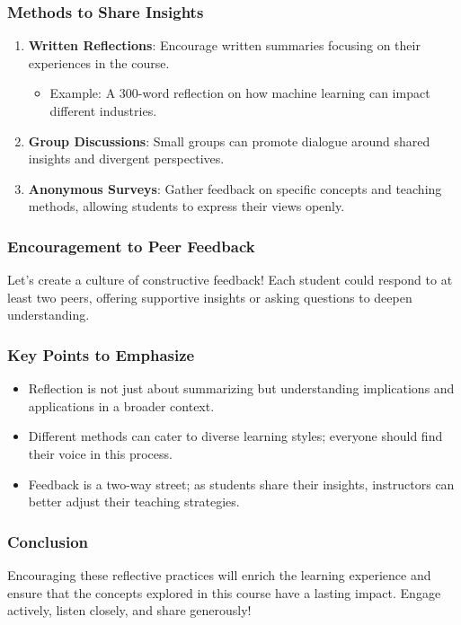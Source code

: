 \documentclass[aspectratio=169]{beamer}
\begin{document}
\begin{frame}[fragile]
    \frametitle{Methods to Share Insights}
    \begin{enumerate}
        \item \textbf{Written Reflections}: Encourage written summaries focusing on their experiences in the course. 
            \begin{itemize}
                \item Example: A 300-word reflection on how machine learning can impact different industries.
            \end{itemize}
        \item \textbf{Group Discussions}: Small groups can promote dialogue around shared insights and divergent perspectives.
        \item \textbf{Anonymous Surveys}: Gather feedback on specific concepts and teaching methods, allowing students to express their views openly.
    \end{enumerate}
\end{frame}

\begin{frame}[fragile]
    \frametitle{Encouragement to Peer Feedback}
    Let's create a culture of constructive feedback! Each student could respond to at least two peers, offering supportive insights or asking questions to deepen understanding.
\end{frame}

\begin{frame}[fragile]
    \frametitle{Key Points to Emphasize}
    \begin{itemize}
        \item Reflection is not just about summarizing but understanding implications and applications in a broader context.
        \item Different methods can cater to diverse learning styles; everyone should find their voice in this process.
        \item Feedback is a two-way street; as students share their insights, instructors can better adjust their teaching strategies.
    \end{itemize}
\end{frame}

\begin{frame}[fragile]
    \frametitle{Conclusion}
    Encouraging these reflective practices will enrich the learning experience and ensure that the concepts explored in this course have a lasting impact. Engage actively, listen closely, and share generously!
\end{frame}
\end{document}
